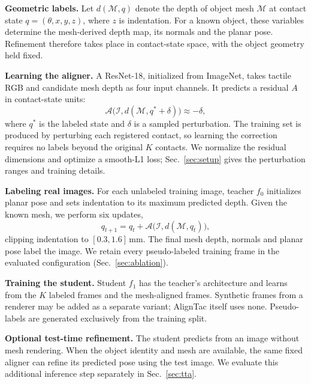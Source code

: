 \noindent\textbf{Geometric labels.} Let $d(\mathcal{M},q)$ denote the depth of object mesh $\mathcal{M}$ at contact state $q=(\theta,x,y,z)$, where $z$ is indentation. For a known object, these variables determine the mesh-derived depth map, its normals and the planar pose. Refinement therefore takes place in contact-state space, with the object geometry held fixed.

\noindent\textbf{Learning the aligner.} A ResNet-18, initialized from ImageNet, takes tactile RGB and candidate mesh depth as four input channels. It predicts a residual $A$ in contact-state units:
\begin{equation}
    \mathcal{A}\big(\mathcal{I},d(\mathcal{M},q^\ast+\delta)\big)\approx-\delta,
\end{equation}
where $q^\ast$ is the labeled state and $\delta$ is a sampled perturbation. The training set is produced by perturbing each registered contact, so learning the correction requires no labels beyond the original $K$ contacts. We normalize the residual dimensions and optimize a smooth-L1 loss; Sec.~\ref{sec:setup} gives the perturbation ranges and training details.

\noindent\textbf{Labeling real images.} For each unlabeled training image, teacher $f_0$ initializes planar pose and sets indentation to its maximum predicted depth. Given the known mesh, we perform six updates,
\begin{equation}
    q_{t+1}=q_t+\mathcal{A}\big(\mathcal{I},d(\mathcal{M},q_t)\big),
\end{equation}
clipping indentation to $[0.3,1.6]\,$mm. The final mesh depth, normals and planar pose label the image. We retain every pseudo-labeled training frame in the evaluated configuration (Sec.~\ref{sec:ablation}).

\noindent\textbf{Training the student.} Student $f_1$ has the teacher's architecture and learns from the $K$ labeled frames and the mesh-aligned frames. Synthetic frames from a renderer may be added as a separate variant; AlignTac itself uses none. Pseudo-labels are generated exclusively from the training split.

\noindent\textbf{Optional test-time refinement.} The student predicts from an image without mesh rendering. When the object identity and mesh are available, the same fixed aligner can refine its predicted pose using the test image. We evaluate this additional inference step separately in Sec.~\ref{sec:tta}.

